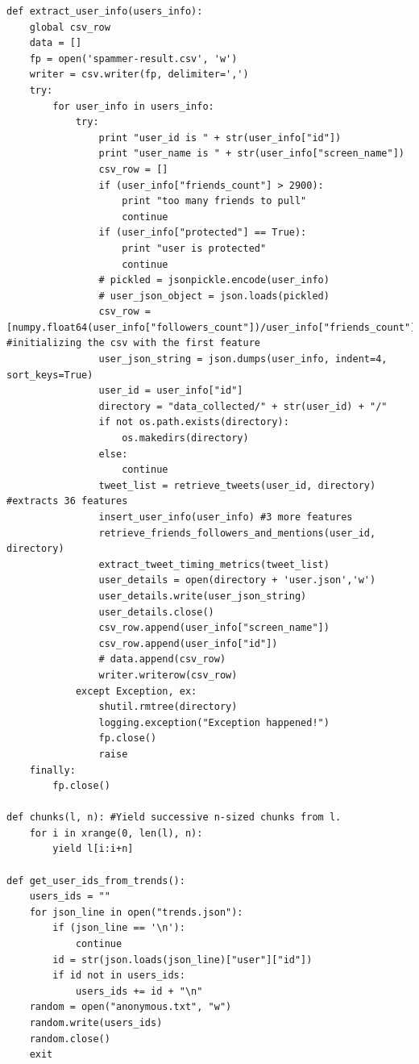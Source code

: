 \documentclass[11pt]{article}
\begin{document}
\begin{lstlisting}
def extract_user_info(users_info):
    global csv_row
    data = []
    fp = open('spammer-result.csv', 'w')
    writer = csv.writer(fp, delimiter=',')
    try:
        for user_info in users_info:
            try:
                print "user_id is " + str(user_info["id"])
                print "user_name is " + str(user_info["screen_name"])
                csv_row = []
                if (user_info["friends_count"] > 2900):
                    print "too many friends to pull"
                    continue
                if (user_info["protected"] == True):
                    print "user is protected"
                    continue
                # pickled = jsonpickle.encode(user_info)
                # user_json_object = json.loads(pickled)
                csv_row = [numpy.float64(user_info["followers_count"])/user_info["friends_count"]] #initializing the csv with the first feature
                user_json_string = json.dumps(user_info, indent=4, sort_keys=True)
                user_id = user_info["id"]
                directory = "data_collected/" + str(user_id) + "/"
                if not os.path.exists(directory):
                    os.makedirs(directory)
                else:
                    continue
                tweet_list = retrieve_tweets(user_id, directory) #extracts 36 features
                insert_user_info(user_info) #3 more features
                retrieve_friends_followers_and_mentions(user_id, directory)
                extract_tweet_timing_metrics(tweet_list)
                user_details = open(directory + 'user.json','w')
                user_details.write(user_json_string)
                user_details.close()
                csv_row.append(user_info["screen_name"])
                csv_row.append(user_info["id"])
                # data.append(csv_row)
                writer.writerow(csv_row)
            except Exception, ex:
                shutil.rmtree(directory)
                logging.exception("Exception happened!")
                fp.close()
                raise
    finally:
        fp.close()

def chunks(l, n): #Yield successive n-sized chunks from l.
    for i in xrange(0, len(l), n):
        yield l[i:i+n]

def get_user_ids_from_trends():
    users_ids = ""
    for json_line in open("trends.json"):
        if (json_line == '\n'):
            continue
        id = str(json.loads(json_line)["user"]["id"])
        if id not in users_ids:
            users_ids += id + "\n"
    random = open("anonymous.txt", "w")
    random.write(users_ids)
    random.close()
    exit


\end{lstlisting}
\end{document}
